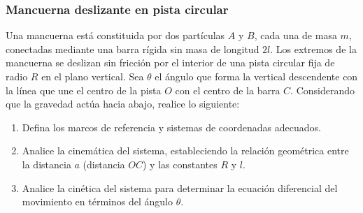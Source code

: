 \subsubsection{Mancuerna deslizante en pista circular}

Una mancuerna está constituida por dos partículas $A$ y $B$, cada una de masa $m$, conectadas mediante una barra rígida sin masa de longitud $2l$. Los extremos de la mancuerna se deslizan sin fricción por el interior de una pista circular fija de radio $R$ en el plano vertical. Sea $\theta$ el ángulo que forma la vertical descendente con la línea que une el centro de la pista $O$ con el centro de la barra $C$. Considerando que la gravedad actúa hacia abajo, realice lo siguiente:

\begin{enumerate}
    \item Defina los marcos de referencia y sistemas de coordenadas adecuados.
    \item Analice la cinemática del sistema, estableciendo la relación geométrica entre la distancia $a$ (distancia $OC$) y las constantes $R$ y $l$.
    \item Analice la cinética del sistema para determinar la ecuación diferencial del movimiento en términos del ángulo $\theta$.
\end{enumerate}

